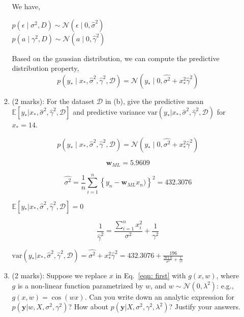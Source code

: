 \documentclass[11pt]{article}
\newcommand{\mbf}[1]{{\boldsymbol{\mathbf{#1}}}}
\renewcommand{\bm}{\mbf}
\begin{document}
\begin{enumerate}
\begin{enumerate}[label=(\alph*)]
We have,

$ p( \epsilon \mid \sigma^2, D) \sim \mathcal{N}\left( \epsilon \mid 0, \hat{\sigma}^2 \right)$ \\
$ p( a \mid \gamma^2, D) \sim    \mathcal{N}\left( a \mid 0, \hat{\gamma}^2 \right)$

Based on the gaussian distribution, we can compute the predictive distribution property,
$$
p(y_* \mid x_*, \hat{\sigma}^2, \hat{\gamma}^2, \mathcal{D})=\mathcal{N}\left( y_* \mid 0, \hat{\sigma^2} + x_*^2\hat{\gamma}^2\right)
$$




\item (2 marks): For the dataset $\mathcal{D}$ in (b), give the predictive mean $\mathbb{E}[y_* | x_*, \hat{\sigma}^2, \hat{\gamma}^2, \mathcal{D}]$ and predictive variance $\text{var}(y_* |  x_*, \hat{\sigma}^2, \hat{\gamma}^2, \mathcal{D})$ for $x_* = 14$.

$$
p(y_* \mid x_*, \hat{\sigma}^2, \hat{\gamma}^2, \mathcal{D})=\mathcal{N}\left( y_* \mid 0, \hat{\sigma^2} + x_*^2\hat{\gamma}^2\right)
$$

$$
\mathbf{w}_{M L} = 5.9609
$$

$$
\hat{\sigma^2}=\frac{1}{n} \sum_{i=1}^{n}\left\{y_{n}-\mathbf{w}_{M L} x_{n})\right\}^{2} = 432.3076
$$

$\mathbb{E}[y_* | x_*, \hat{\sigma}^2, \hat{\gamma}^2, \mathcal{D}] = 0 $


$$
\frac{1}{\hat{\gamma}^2} = \frac{\sum_{i=1}^{n}{x_i^2}}{\sigma^2} + \frac{1}{\gamma^2} 
$$

$\text{var}(y_* |  x_*, \hat{\sigma}^2, \hat{\gamma}^2, \mathcal{D}) = \hat{\sigma^2} +  x_*^2\hat{\gamma}^2 = 432.3076 + \frac{196}{\frac{371.0}{\sigma^2} + \frac{1}{\gamma^2}}$

\item (2 marks): Suppose we replace $x$ in Eq.~\eqref{eqn: first} with $g(x,w)$, where $g$ is a non-linear function parametrized by $w$,
and $w \sim \mathcal{N}(0,\lambda^2)$: e.g., $g(x,w) = \cos (w x)$.  Can you write down an analytic expression for $p(\bm{y} | w, X, \sigma^2, \gamma^2)$?  How about $p(\bm{y} | X, \sigma^2, \gamma^2, \lambda^2)$?  Justify your answers.


\end{enumerate}
\end{enumerate}
\end{document}
